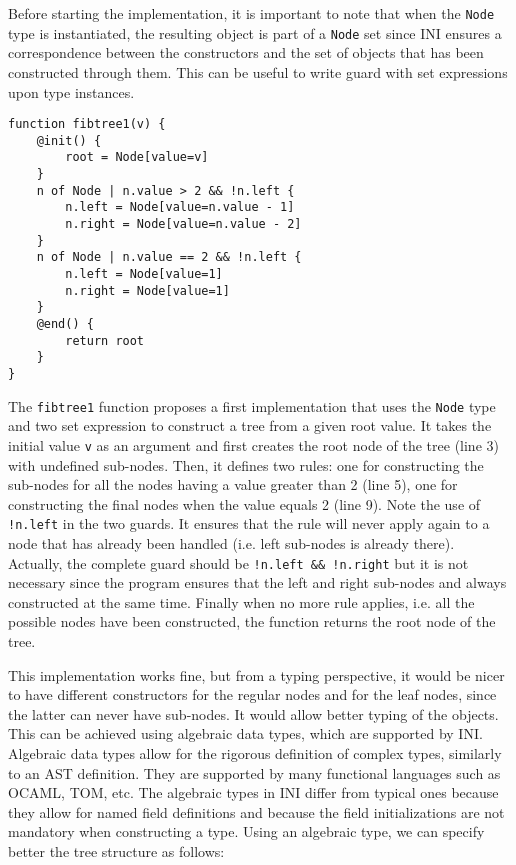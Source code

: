 \documentclass[11pt]{article}
\begin{document}
Before starting the implementation, it is important to note that when the \texttt{Node} type is instantiated, the resulting object is part of a \texttt{Node} set since INI ensures a correspondence between the constructors and the set of objects that has been constructed through them. This can be useful to write guard with set expressions upon type instances.

\begin{lstlisting}
function fibtree1(v) {
	@init() {
		root = Node[value=v]
	}
	n of Node | n.value > 2 && !n.left {
		n.left = Node[value=n.value - 1]
		n.right = Node[value=n.value - 2]
	}
	n of Node | n.value == 2 && !n.left {
		n.left = Node[value=1]
		n.right = Node[value=1]
	}
	@end() {
		return root
	}
}
\end{lstlisting}

The \texttt{fibtree1} function proposes a first implementation that uses the \texttt{Node} type and two set expression to construct a tree from a given root value. It takes the initial value \texttt{v} as an argument and first creates the root node of the tree (line 3) with undefined sub-nodes. Then, it defines two rules: one for constructing the sub-nodes for all the nodes having a value greater than 2 (line 5), one for constructing the final nodes when the value equals 2 (line 9). Note the use of \texttt{!n.left} in the two guards. It ensures that the rule will never apply again to a node that has already been handled (i.e. left sub-nodes is already there). Actually, the complete guard should be \texttt{!n.left \&\& !n.right} but it is not necessary since the program ensures that the left and right sub-nodes and always constructed at the same time. Finally when no more rule applies, i.e. all the possible nodes have been constructed, the function returns the root node of the tree.

This implementation works fine, but from a typing perspective, it would be nicer to have different constructors for the regular nodes and for the leaf nodes, since the latter can never have sub-nodes. It would allow better typing of the objects. This can be achieved using algebraic data types, which are supported by INI. Algebraic data types allow for the rigorous definition of complex types, similarly to an AST definition. They are supported by many functional languages such as OCAML, TOM, etc. The algebraic types in INI differ from typical ones because they allow for named field definitions and because the field initializations are not mandatory when constructing a type. Using an algebraic type, we can specify better the tree structure as follows:
\end{document}
